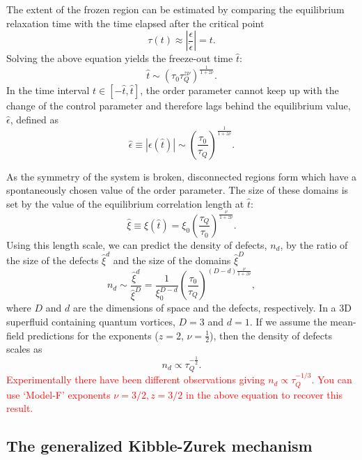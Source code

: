 The extent of the frozen region can be estimated by comparing the equilibrium
relaxation time with the time elapsed after the critical point
\begin{equation}
    \tau(t) \approx \left|\frac{\epsilon}{\dot{\epsilon}}\right|=t.
\end{equation}
Solving the above equation yields the freeze-out time $\hat{t}$:
\begin{equation}
    \hat{t} \sim (\tau_0\tau_Q^{z\nu})^{\frac{1}{1+z\nu}}.
\end{equation}
In the time interval $t \in [-\hat{t}, \hat{t}]$, the order parameter cannot
keep up with the change of the control parameter and therefore lags
behind the equilibrium value, $\hat{\epsilon}$, defined as
\begin{equation}
    \hat{\epsilon} \equiv |\epsilon(\hat{t})| \sim 
    \left(\frac{\tau_0}{\tau_Q}\right)^\frac{1}{1+z\nu}.
\end{equation}

As the symmetry of the system is broken, disconnected regions form which
have a spontaneously chosen value of the order parameter.
The size of these domains is set by the value of the equilibrium correlation
length at $\hat{t}$:
\begin{equation}
    \hat{\xi} \equiv \xi(\hat{t}) 
    = \xi_0 \left(\frac{\tau_Q}{\tau_0}\right)^\frac{\nu}{1 + z\nu}.
\end{equation}
Using this length scale, we can predict the density of defects, $n_d$, by
the ratio of the size of the defects $\hat{\xi}^d$ and the size of the domains
$\hat{\xi}^D$
\begin{equation}
    n_d \sim \frac{\hat{\xi}^d}{\hat{\xi}^D}=\frac{1}{\xi_0^{D-d}}
    \left(\frac{\tau_0}{\tau_Q}\right)^{(D-d)\frac{\nu}{1 + z\nu}},
\end{equation}
where $D$ and $d$ are the dimensions of space and the defects, respectively.
In a 3D superfluid containing quantum vortices, $D=3$ and $d=1$.
If we assume the mean-field predictions for the exponents
($z=2$, $\nu=\frac{1}{2}$), then the density of defects scales as
\begin{equation}
    n_d \propto \tau_Q^{-\frac{1}{2}}.
\end{equation}
\textcolor{red}{Experimentally there have been different observations giving
$n_d \propto \tau_Q^{-1/3}$. You can use `Model-F' exponents $\nu=3/2, z=3/2$
in the above equation to recover this result.}

\subsection{The generalized Kibble-Zurek mechanism}

